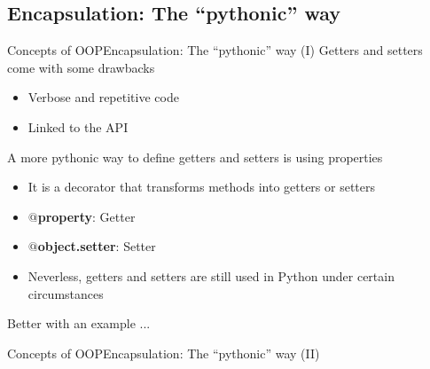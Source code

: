 \documentclass[10pt,compress]{beamer} %
\begin{document}
\subsection{Encapsulation: The ``pythonic'' way}
\begin{frame}{Concepts of OOP}{Encapsulation: The ``pythonic'' way (I)}
    Getters and setters come with some drawbacks
    \begin{itemize}
        \item Verbose and repetitive code
        \item Linked to the API
    \end{itemize}

    A more pythonic way to define getters and setters is using \alert{properties}
	\begin{itemize}
		\item It is a \alert{decorator} that transforms methods into getters or setters
		\item[] \textbf{$@$property}: Getter
		\item[] \textbf{$@$object.setter}: Setter
        \item Neverless, getters and setters are still used in Python under certain circumstances
	\end{itemize}

    Better with an example ...
\end{frame}

\begin{frame}{Concepts of OOP}{Encapsulation: The ``pythonic'' way (II)}
	\begin{exampleblock}{}
	\vspace{-0.3cm} 
		
	\end{exampleblock}
\end{frame}
\end{document}
